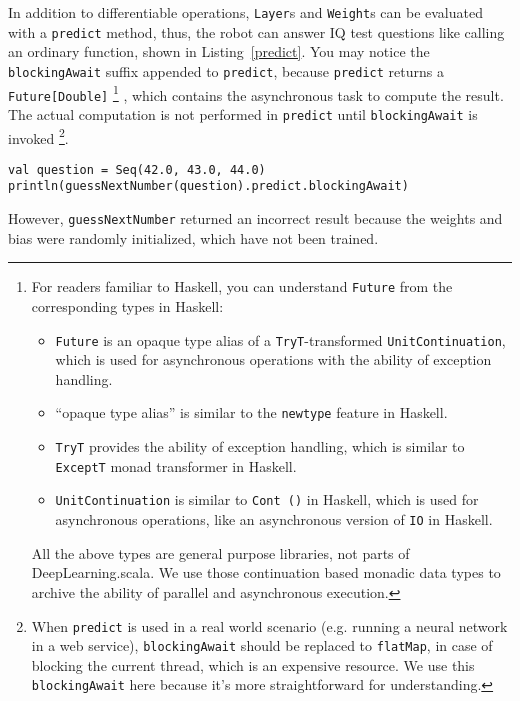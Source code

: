 In addition to differentiable operations, \lstinline{Layer}s and \lstinline{Weight}s can be evaluated with a \lstinline{predict} method, thus, the robot can answer IQ test questions like calling an ordinary function, shown in Listing~\ref{predict}. 
You may notice the \lstinline{blockingAwait} suffix appended to \lstinline{predict}, because \lstinline{predict} returns a \lstinline{Future[Double]}
\footnote{ 
  For readers familiar to Haskell, you can understand \lstinline{Future} from the corresponding types in Haskell:
  \begin{itemize}
    \item \lstinline{Future} is an opaque type alias of a \lstinline{TryT}-transformed \lstinline{UnitContinuation}, which is used for asynchronous operations with the ability of exception handling.
    \item ``opaque type alias'' is similar to the \lstinline{newtype} feature in Haskell.
    \item \lstinline{TryT} provides the ability of exception handling, which is similar to \lstinline{ExceptT} monad transformer in Haskell.
    \item \lstinline{UnitContinuation} is similar to \lstinline{Cont ()} in Haskell, which is used for asynchronous operations, like an asynchronous version of \lstinline{IO} in Haskell.
  \end{itemize}
  All the above types are general purpose libraries, not parts of DeepLearning.scala. We use those continuation based monadic data types to archive the ability of parallel and asynchronous execution.
}
, which contains the asynchronous task to compute the result. The actual computation is not performed in  \lstinline{predict} until \lstinline{blockingAwait} is invoked \footnote{
  When \lstinline{predict} is used in a real world scenario (e.g. running a neural network in a web service), \lstinline{blockingAwait} should be replaced to \lstinline{flatMap}, in case of blocking the current thread, which is an expensive resource. We use this \lstinline{blockingAwait} here because it's more straightforward for understanding.
}.

\begin{lstlisting}[float={h t b p},caption={Inference on an untrained model},label={predict}]
val question = Seq(42.0, 43.0, 44.0)
println(guessNextNumber(question).predict.blockingAwait)
\end{lstlisting}

However, \lstinline{guessNextNumber} returned an incorrect result because the weights and bias were randomly initialized, which have not been trained.

